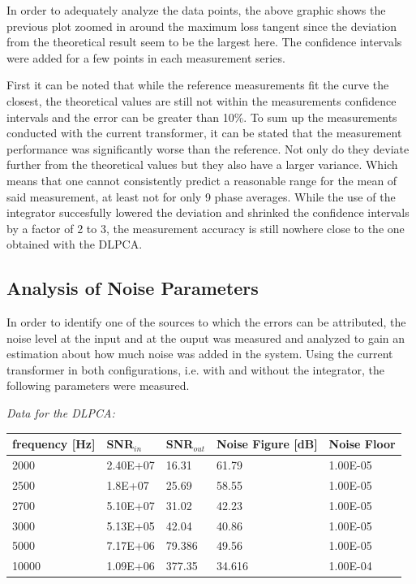 In order to adequately analyze the data points, the above graphic shows the previous plot
zoomed in around the maximum loss tangent since the deviation from the theoretical result seem to be the largest here.
The confidence intervals were added for a few points in each measurement series.

First it can be noted that while the reference measurements fit the curve the closest, the theoretical values are still not
within the measurements confidence intervals and the error can be greater than 10\%. To sum up the measurements conducted with
the current transformer, it can be stated that the measurement performance was significantly worse than the reference. Not only do they deviate further from the theoretical values
but they also have a larger variance. Which means that one cannot consistently predict a reasonable range for the mean of said measurement, at least not for only 9 phase averages.
While the use of the integrator succesfully lowered the deviation and shrinked the confidence intervals by a factor of 2 to 3, the measurement accuracy is still nowhere close to the one obtained with the DLPCA.

\subsection{Analysis of Noise Parameters}

In order to identify one of the sources to which the errors can be attributed, the noise level at the input and at the ouput was measured and analyzed to gain an estimation about how much noise was added in the system.
Using the current transformer in both configurations, i.e. with and without the integrator, the following parameters were measured. 

\newpage

\textit{Data for the DLPCA:}

\begin{center}
\begin{tabular}{|m{3cm}|m{3cm}|m{1.3cm}|m{4cm}|m{2cm}|} 
\hline
frequency [Hz]& SNR$_{in}$ & SNR$_{out}$ & Noise Figure [dB] & Noise Floor \\ 
\hline \hline
2000 & 2.40E+07 & 16.31 & \cellcolor{blue!25}61.79 & 1.00E-05 \\ 
\hline
2500 & 1.8E+07 & 25.69 & \cellcolor{blue!25}58.55 & 1.00E-05 \\ 
\hline
2700 & 5.10E+07 & 31.02 & \cellcolor{blue!25}42.23 & 1.00E-05 \\ 
\hline
3000 & 5.13E+05 & 42.04 & \cellcolor{blue!25}40.86 & 1.00E-05 \\ 
\hline
5000 & 7.17E+06 & 79.386 & \cellcolor{blue!25}49.56 & 1.00E-05 \\ 
\hline
10000 & 1.09E+06 & 377.35 & \cellcolor{red!25}34.616 & 1.00E-04 \\ 
\hline

\end{tabular}
\end{center}



